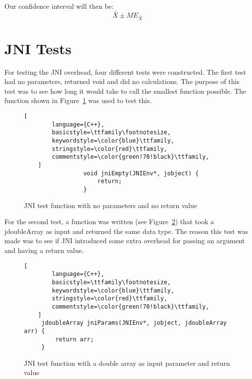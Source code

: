 Our confidence interval will then be:
\begin{equation*}
    \bar{X} \pm ME_{\bar{X}}
\end{equation*}


\section{JNI Tests}
For testing the JNI overhead, four different tests were constructed. The first test had no parameters, returned void and did no calculations. The purpose of this test was to see how long it would take to call the smallest function possible. The function shown in Figure~\ref{fig:jni:empty} was used to test this.

\begin{figure}[H]
\begin{lstlisting}[
        language={C++},
        basicstyle=\ttfamily\footnotesize,
        keywordstyle=\color{blue}\ttfamily,
        stringstyle=\color{red}\ttfamily,
        commentstyle=\color{green!70!black}\ttfamily,
    ]
                 void jniEmpty(JNIEnv*, jobject) {
                     return;
                 }
\end{lstlisting}
\caption{JNI test function with no parameters and no return value}
\label{fig:jni:empty}
\end{figure}

For the second test, a function was written (see Figure~\ref{fig:jni:params}) that took a jdoubleArray as input and returned the same data type. The reason this test was made was to see if JNI introduced some extra overhead for passing an argument and having a return value.

\begin{figure}[H]
\begin{lstlisting}[
        language={C++},
        basicstyle=\ttfamily\footnotesize,
        keywordstyle=\color{blue}\ttfamily,
        stringstyle=\color{red}\ttfamily,
        commentstyle=\color{green!70!black}\ttfamily,
    ]
     jdoubleArray jniParams(JNIEnv*, jobject, jdoubleArray arr) {
         return arr;
     }
\end{lstlisting}
\caption{JNI test function with a double array as input parameter and return value}
\label{fig:jni:params}
\end{figure}

